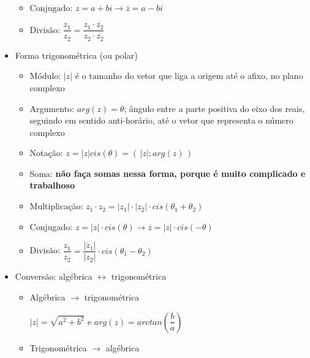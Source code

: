 \documentclass[a4paper, 12pt]{article}
\begin{document}
\begin{itemize}
\begin{itemize}
\item $ \textrm{Conjugado: } z = a + bi \longrightarrow \overline{z} = a - bi $

\item $ \textrm{Divisão: } \dfrac{z_1}{z_2} = \dfrac{ z_1 \cdot \overline{z_2} }{z_2 \cdot \overline{z_2}} $

	\end{itemize}

\item Forma trigonométrica (ou polar)


	\begin{itemize}
	
\item Módulo: $ |z| $ é o tamanho do vetor que liga a origem até o afixo, no plano complexo	

\item Argumento: $ arg(z) = \theta $; ângulo entre a parte positiva do eixo dos reais, seguindo em sentido anti-horário, até o vetor que representa o número complexo
	
\item Notação: $ z = |z|cis(\theta) = (\, |z| ; arg(z) \,)$

\item Soma: \textbf{não faça somas nessa forma, porque é muito complicado e trabalhoso}

\item Multiplicação: $z_1 \cdot z_2 = |z_1| \cdot |z_2| \cdot cis(\theta_1 + \theta_2) $

\item Conjugado: $z = |z| \cdot cis(\theta) \longrightarrow \overline{z} = |z| \cdot cis (-\theta) $

\item Divisão: $ \dfrac{z_1}{z_2} = \dfrac{|z_1|}{|z_2|} \cdot cis(\theta_1 - \theta_2) $

	\end{itemize}


\item Conversão: algébrica $\longleftrightarrow$ trigonométrica


	\begin{itemize}
	
\item Algébrica $\longrightarrow$ trigonométrica

$ |z| = \sqrt{a^2 + b^2} $ e $ arg(z) = arctan (\dfrac{b}{a}) $

\item Trigonométrica $\longrightarrow$ algébrica


\end{itemize}
\end{itemize}
\end{document}
